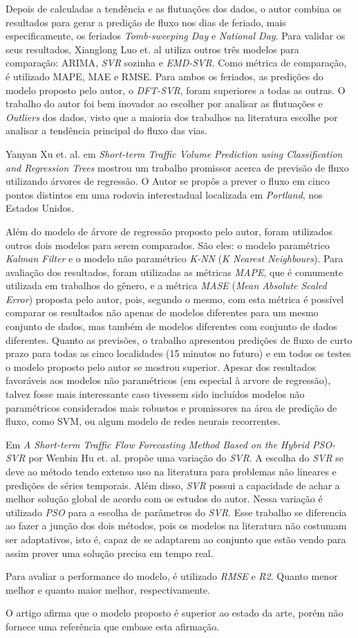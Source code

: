 Depois de calculadas a tendência e as flutuações dos dados, o autor combina os resultados para gerar a predição de fluxo nos dias de feriado, mais especificamente, os feriados \textit{ Tomb-sweeping Day} e \textit{National Day}. Para validar os seus resultados, Xianglong Luo et. al utiliza outros três modelos para comparação: \acrshort{ARIMA}, \textit{SVR} sozinha e \textit{EMD-SVR}. Como métrica de comparação, é utilizado \acrshort{MAPE}, \acrshort{MAE} e \acrshort{RMSE}.  Para ambos os feriados, as predições do modelo proposto pelo autor, o \textit{DFT-SVR}, foram superiores a todas as outras. O trabalho do autor foi bem inovador ao escolher por analisar as flutuações e \textit{Outliers} dos dados, visto que a maioria dos trabalhos na literatura escolhe por analisar a tendência principal do fluxo das vias.

Yanyan Xu et. al. em \textit{Short-term Traffic Volume Prediction using Classification and Regression Trees} \cite{xu2013short} mostrou um trabalho promissor acerca de previsão de fluxo utilizando árvores de regressão. O Autor se propôs a prever o fluxo em cinco pontos distintos em uma rodovia interestadual localizada em \textit{Portland}, nos Estados Unidos.

Além do modelo de árvore de regressão proposto pelo autor, foram utilizados outros dois modelos para serem comparados. São eles: o modelo paramétrico \textit{Kalman Filter} e o modelo não paramétrico \textit{K-NN} (\textit{K Nearest Neighbours}). Para avaliação dos resultados, foram utilizadas as métricas \textit{MAPE}, que é comumente utilizada em trabalhos do gênero, e a métrica \textit{MASE} (\textit{Mean
Absolute Scaled Error}) proposta pelo autor, pois, segundo o mesmo, com esta métrica é possível comparar os resultados não apenas de modelos diferentes para um mesmo conjunto de dados, mas também de modelos diferentes com conjunto de dados diferentes. 
Quanto as previsões, o trabalho apresentou predições de fluxo de curto prazo para todas as cinco localidades (15 minutos no futuro) e em todos os testes o modelo proposto pelo autor se mostrou superior. Apesar dos resultados favoráveis aos modelos não paramétricos (em especial à arvore de regressão), talvez fosse mais interessante caso tivessem sido incluídos modelos não paramétricos considerados mais robustos e promissores na área de predição de fluxo, como \acrshort{SVM}, ou algum modelo de redes neurais recorrentes. 


Em \textit{A Short-term Traffic Flow Forecasting Method Based on the Hybrid PSO-SVR} por Wenbin Hu et. al. \cite{Hu2016} propõe uma variação do \textit{\acrfull{SVR}}. A escolha do \textit{\acrshort{SVR}} se deve ao método tendo extenso uso na literatura para problemas não lineares e predições de séries temporais. Além disso, \textit{\acrshort{SVR}} possui a capacidade de achar a melhor solução global de acordo com os estudos do autor. Nessa variação é utilizado \textit{\acrfull{PSO}} para a escolha de parâmetros do \textit{\acrshort{SVR}}. Esse trabalho se diferencia ao fazer a junção dos dois métodos, pois os modelos na literatura não costumam ser adaptativos, isto é, capaz de se adaptarem ao conjunto que estão vendo para assim prover uma solução precisa em tempo real.

Para avaliar a performance do modelo, é utilizado \textit{\acrshort{RMSE}} e \textit{\acrfull{R2}}. Quanto menor melhor e quanto maior melhor, respectivamente. 

O artigo afirma que o modelo proposto é superior ao estado da arte, porém não fornece uma referência que embase esta afirmação.
